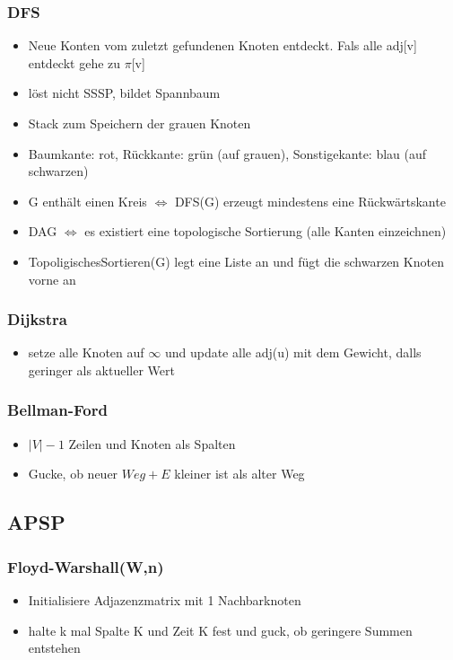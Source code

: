 \documentclass{article}
\begin{document}
\subsubsection{DFS}
\begin{itemize}
\item Neue Konten vom zuletzt gefundenen Knoten entdeckt. Fals alle adj[v] entdeckt gehe zu $\pi$[v]
\item l{\"o}st nicht SSSP, bildet Spannbaum
\item Stack zum Speichern der grauen Knoten
\item Baumkante: rot, R{\"u}ckkante: gr{\"u}n (auf grauen), Sonstigekante: blau (auf schwarzen)
\item G enth{\"a}lt einen Kreis $\Leftrightarrow$ DFS(G) erzeugt mindestens eine R{\"u}ckw{\"a}rtskante
\item DAG $\Leftrightarrow$ es existiert eine topologische Sortierung (alle Kanten einzeichnen)
\item TopoligischesSortieren(G) legt eine Liste an und f{\"u}gt die schwarzen Knoten vorne an
\end{itemize}

\subsubsection{Dijkstra}
\begin{itemize}
\item setze alle Knoten auf $\infty$ und update alle adj(u) mit dem Gewicht, dalls geringer als aktueller Wert
\end{itemize}


\subsubsection{Bellman-Ford}
\begin{itemize}
\item $|V|-1$ Zeilen und Knoten als Spalten 
\item Gucke, ob neuer $Weg+E$ kleiner ist als alter Weg
\end{itemize}

\subsection{APSP}
\subsubsection{Floyd-Warshall(W,n)}
\begin{itemize}
\item Initialisiere Adjazenzmatrix mit 1 Nachbarknoten
\item halte k mal Spalte K und Zeit K fest und guck, ob geringere Summen entstehen
\end{itemize}
\end{document}
